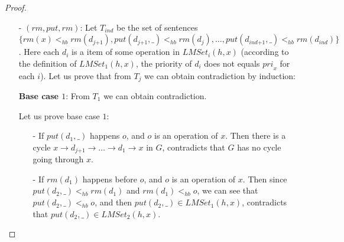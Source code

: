 \documentclass{llncs}
\begin{document}
\begin {proof}
\begin{itemize}
\begin{itemize}
    \item[-] If $( j = 1 ) \wedge ( \textit{put}(d_j,\_) <_{hb} o'' )$, where $o''$ is an operation of $x$: Similar to above case.

    \item[-] If $( j > 1 ) \wedge ( \textit{rm}(d_j) <_{hb} o'' )$, where $o''$ is an operation of item $d_{\textit{j-1}}$ and $\textit{put}(d_{\textit{j-1}},\_), \textit{rm}(d_{\textit{j-1}}) \in \textit{LMSet}_{\textit{j-1}}(h,x)$: Then since $( \textit{put}(d_{\textit{j+1}},\_) <_{hb} \textit{put}(d_j,\_) ) \wedge ( \textit{rm}(d_j) <_{hb} o'' )$, we can see that $( \textit{put}(d_{\textit{j+1}},\_) <_{hb} o'' ) \vee ( \textit{rm}(d_j) <_{hb} \textit{put}(d_j,\_) )$, which is impossible.

    \item[-] If $( j > 1 ) \wedge ( \textit{rm}(d_j) <_{hb} o'' )$, where $o''$ is an operation of $x$: Similar to above case.
    \end{itemize}

\item[-] $(\textit{rm},\textit{put},\textit{rm})$: Let $T_{\textit{ind}}$ be the set of sentences $\{ \textit{rm}(x) <_{hb} \textit{rm}(d_{\textit{j+1}}), \textit{put}(d_{\textit{j+1}},\_) <_{hb} \textit{rm}(d_j),\ldots, \textit{put}(d_{\textit{ind+1}},\_) <_{hb} \textit{rm}(d_{\textit{ind}}) \}$. Here each $d_i$ is a item of some operation in $\textit{LMSet}_i(h,x)$ (according to the definition of $\textit{LMSet}_1(h,x)$, the priority of $d_i$ does not equals $\textit{pri}_x$ for each $i$). Let us prove that from $T_j$ we can obtain contradiction by induction:

    {\bf Base case $1$}: From $T_1$ we can obtain contradiction.

    Let us prove base case $1$:

    \begin{itemize}
    \setlength{\itemsep}{0.5pt}
    \item[-] If $\textit{put}(d_1,\_)$ happens $o$, and $o$ is an operation of $x$. Then there is a cycle $x \rightarrow d_{\textit{j+1}} \rightarrow \ldots \rightarrow d_1 \rightarrow x$ in $G$, contradicts that $G$ has no cycle going through $x$.

    \item[-] If $\textit{rm}(d_1)$ happens before $o$, and $o$ is an operation of $x$. Then since $\textit{put}(d_2,\_) <_{hb} \textit{rm}(d_1)$ and $\textit{rm}(d_1) <_{hb} o$, we can see that $\textit{put}(d_2,\_) <_{hb} o$, and then $\textit{put}(d_2,\_) \in \textit{LMSet}_1(h,x)$, contradicts that $\textit{put}(d_2,\_) \in \textit{LMSet}_2(h,x)$.
    \end{itemize}


\end{itemize}
\end{proof}
\end{document}
